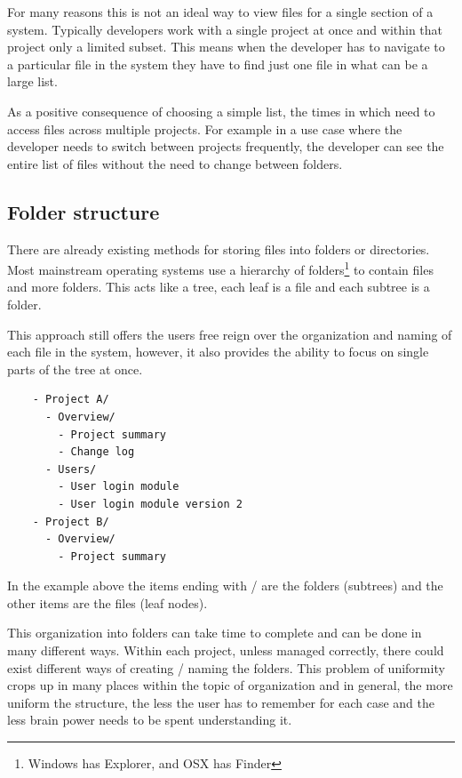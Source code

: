 For many reasons this is not an ideal way to view files for a single section of a system. Typically developers work with a single project at once and within that project only a limited subset. This means when the developer has to navigate to a particular file in the system they have to find just one file in what can be a large list.


As a positive consequence of choosing a simple list, the times in which need to
access files across multiple projects. For example in a use case where the developer
needs to switch between projects frequently, the developer can see the
entire list of files without the need to change between folders.

\subsection{Folder structure}\label{folder-structure-i.e.explorer-finder}

There are already existing methods for storing files into folders or
directories. Most mainstream operating systems use a hierarchy of
folders\footnote{Windows has Explorer, and OSX has Finder} to contain files
and more folders. This acts like a tree, each leaf is a file and each subtree
is a folder.

This approach still offers the users free reign over the organization
and naming of each file in the system, however, it also provides the
ability to focus on single parts of the tree at once.

\begin{verbatim}
    - Project A/
      - Overview/
        - Project summary
        - Change log
      - Users/
        - User login module
        - User login module version 2
    - Project B/
      - Overview/
        - Project summary
\end{verbatim}

In the example above the items ending with / are the folders (subtrees) and the
other items are the files (leaf nodes).

This organization into folders can take time to complete and can be done in many
different ways. Within each project, unless managed correctly, there could exist
different ways of creating / naming the folders. This problem of uniformity
crops up in many places within the topic of organization and in general, the
more uniform the structure, the less the user has to remember for each case and
the less brain power needs to be spent understanding it.


